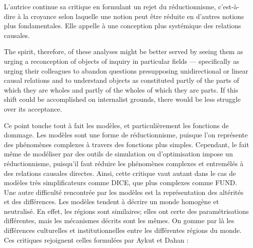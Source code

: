 \begin{displayquote}
    
\end{displayquote}

L'autrice continue sa critique en formulant un rejet du réductionnisme, c'est-à-dire à la croyance selon laquelle une notion peut être réduite en d'autres notions plus fondamentales. Elle appelle à une conception plus systémique des relations causales. 

\begin{displayquote}
    The spirit, therefore, of these analyses might be better served by seeing them as urging a reconception of objects of inquiry in particular fields — specifically as urging their colleagues to abandon questions presupposing unidirectional or linear causal relations and to understand objects as constituted partly of the parts of which they are wholes and partly of the wholes of which they are parts. If this shift could be accomplished on internalist grounds, there would be less struggle over its acceptance.
\end{displayquote}

Ce point touche tout à fait les modèles, et particulièrement les fonctions de dommage. Les modèles sont une forme de réductionnisme, puisque l'on représente des phénomènes complexes à travers des fonctions plus simples. Cependant, le fait même de modéliser par des outils de simulation ou d'optimisation impose un réductionnisme, puisqu'il faut réduire les phénomènes complexes et entremêlés à des relations causales directes. Ainsi, cette critique vaut autant dans le cas de modèles très simplificateurs comme DICE, que plus complexes comme FUND.   \\


Une autre difficulté rencontrée par les modèles est la représentation des altérités et des différences. Les modèles tendent à décrire un monde homogène et neutralisé. En effet, les régions sont similaires; elles ont certe des paramétrisations différentes, mais les mécanismes décrits sont les mêmes. On gomme par là les différences culturelles et institutionnelles entre les différentes régions du monde. \\

Ces critiques rejoignent celles formulées par Aykut et Dahan : 

